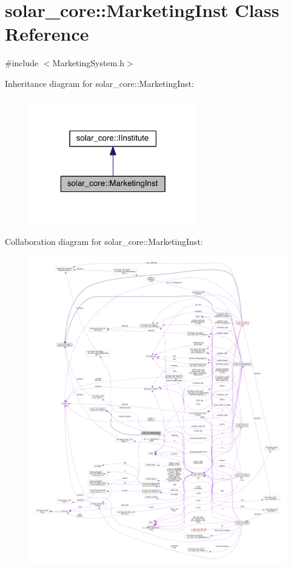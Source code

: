 \hypertarget{classsolar__core_1_1_marketing_inst}{}\section{solar\+\_\+core\+:\+:Marketing\+Inst Class Reference}
\label{classsolar__core_1_1_marketing_inst}


{\ttfamily \#include $<$Marketing\+System.\+h$>$}



Inheritance diagram for solar\+\_\+core\+:\+:Marketing\+Inst\+:\nopagebreak
\begin{figure}[H]
\begin{center}
\leavevmode
\includegraphics[width=208pt]{classsolar__core_1_1_marketing_inst__inherit__graph}
\end{center}
\end{figure}


Collaboration diagram for solar\+\_\+core\+:\+:Marketing\+Inst\+:\nopagebreak
\begin{figure}[H]
\begin{center}
\leavevmode
\includegraphics[width=350pt]{classsolar__core_1_1_marketing_inst__coll__graph}
\end{center}
\end{figure}
